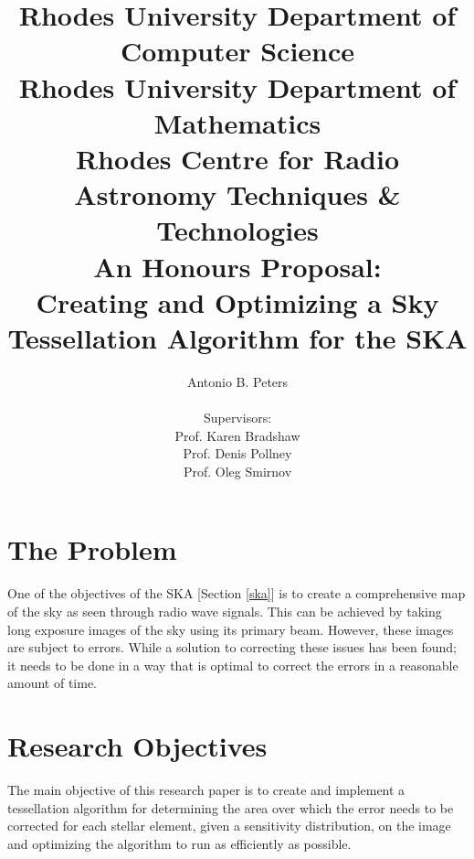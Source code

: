 \documentclass{article}
\begin{document}
\title{	
\small{	Rhodes University Department of Computer Science \\
		Rhodes University Department of Mathematics \\
		Rhodes Centre for Radio Astronomy Techniques \& Technologies} \\
\large{ An Honours Proposal: }\\
\huge{	Creating and Optimizing a Sky Tessellation Algorithm for the SKA }}

\author{	Antonio B. Peters \\ \\
			Supervisors: \\
			Prof. Karen Bradshaw \\
			Prof. Denis Pollney \\
			Prof. Oleg Smirnov }

\maketitle
\section{The Problem}
One of the objectives of the SKA [Section \ref{ska}] is to create a comprehensive map of the sky as seen through radio wave signals. This can be achieved by taking long exposure images of the sky using its primary beam. However, these images are subject to errors. While a solution to correcting these issues has been found; it needs to be done in a way that is optimal to correct the errors in a reasonable amount of time.
\section{Research Objectives}
The main objective of this research paper is to create and implement a tessellation algorithm for determining the area over which the error needs to be corrected for each stellar element, given a sensitivity distribution, on the image and optimizing the algorithm to run as efficiently as possible.
\end{document}
